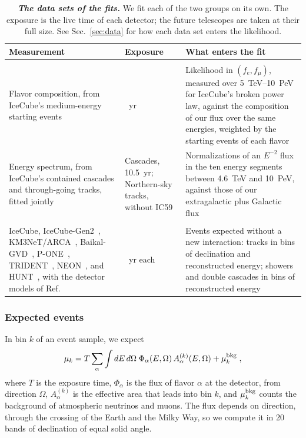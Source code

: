 \documentclass[linenumbers, aps, prd, twocolumn, superscriptaddress, floatfix, longbibliography, nofootinbib, bibnotes]{revtex4-2}
\begin{document}
\begin{table}[t!]
 \caption{\label{tab:data}\textbf{\textit{The data sets of the fits.}} We fit each of the two groups on its own. The exposure is the live time of each detector; the future telescopes are taken at their full size. See Sec.~\ref{sec:data} for how each data set enters the likelihood.}
 \begin{ruledtabular}
 \begin{tabular}{>{\raggedright\arraybackslash}p{}>{\raggedright\arraybackslash}p{}>{\raggedright\arraybackslash}p{}}
 Measurement & Exposure & What enters the fit \\
 \hline
 \multicolumn{3}{l}{\textit{Spectrum and flavor composition}} \\
 Flavor composition, from IceCube's medium-energy starting events~\cite{IceCube:2025ole} & 11.4~yr & Likelihood in $(f_e, f_\mu)$, measured over 5~TeV--10~PeV for IceCube's broken power law, against the composition of our flux over the same energies, weighted by the starting events of each flavor \\
 Energy spectrum, from IceCube's contained cascades and through-going tracks, fitted jointly~\cite{IceCube:2025ewu} & Cascades, 10.5~yr; Northern-sky tracks, without IC59 & Normalizations of an $E^{-2}$ flux in the ten energy segments between 4.6~TeV and 10~PeV, against those of our extragalactic plus Galactic flux \\
 \multicolumn{3}{l}{\textit{Forecast}} \\
 IceCube, IceCube-Gen2~\cite{IceCube-Gen2:2020qha}, KM3NeT/ARCA~\cite{KM3Net:2016zxf}, Baikal-GVD~\cite{Baikal-GVD:2020irv}, P-ONE~\cite{P-ONE:2020ljt}, TRIDENT~\cite{TRIDENT:2022hql}, NEON~\cite{Zhang:2024slv}, and HUNT~\cite{Huang:2023mzt}, with the detector models of Ref.~\cite{Bustamante:2026inprep} & 10~yr each & Events expected without a new interaction: tracks in bins of declination and reconstructed energy; showers and double cascades in bins of reconstructed energy \\
 \end{tabular}
 \end{ruledtabular}
\end{table}

\subsubsection{Expected events}
In bin $k$ of an event sample, we expect
\begin{equation}
 \label{equ:events}
 \mu_k = T \sum_\alpha \int dE\, d\Omega\; \Phi_\alpha(E, \Omega)\, A^{(k)}_\alpha(E, \Omega) + \mu^{\rm bkg}_k \;,
\end{equation}
where $T$ is the exposure time, $\Phi_\alpha$ is the flux of flavor $\alpha$ at the detector, from direction $\Omega$, $A^{(k)}_\alpha$ is the effective area that leads into bin $k$, and $\mu^{\rm bkg}_k$ counts the background of atmospheric neutrinos and muons.
The flux depends on direction, through the crossing of the Earth and the Milky Way, so we compute it in 20 bands of declination of equal solid angle.
\end{document}
